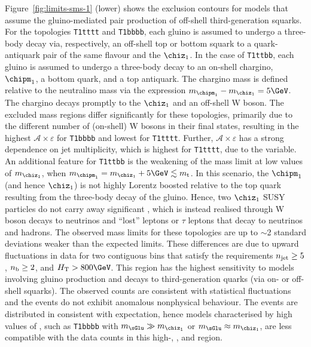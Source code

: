 Figure~\ref{fig:limits-sms-1} (lower) shows the exclusion contours
for models that assume the gluino-mediated pair production of
off-shell third-generation squarks. For the topologies \texttt{T1tttt}
and \texttt{T1bbbb}, each gluino is assumed to undergo a three-body
decay via, respectively, an off-shell top or bottom squark to a
quark-antiquark pair of the same flavour and the $\chiz_1$. In the
case of \texttt{T1ttbb}, each gluino is assumed to undergo a
three-body decay to an on-shell chargino, $\chipm_1$, a bottom quark,
and a top antiquark. The chargino mass is defined relative to the
neutralino mass via the expression $m_{\chipm_1} - m_{\chiz_1} =
5\GeV$. The chargino decays promptly to the $\chiz_1$ and an off-shell
W boson. The excluded mass regions differ significantly for these
topologies, primarily due to the different number of (on-shell) W
bosons in their final states, resulting in the highest $\mathcal{A}
\times \varepsilon$ for \texttt{T1bbbb} and lowest for
\texttt{T1tttt}. Further, $\mathcal{A} \times \varepsilon$ has a
strong dependence on jet multiplicity, which is highest for
\texttt{T1tttt}, due to the \bdphi variable. An additional feature for
\texttt{T1ttbb} is the weakening of the mass limit at low values of
$m_{\chiz_1}$, when $m_{\chipm_1} = m_{\chiz_1} + 5\GeV \lesssim
m_\text{t}$. In this scenario, the $\chipm_1$ (and hence $\chiz_1$) is
not highly Lorentz boosted relative to the top quark resulting from
the three-body decay of the gluino. Hence, two $\chiz_1$ SUSY particles do
not carry away significant \ptvecmiss, which is instead realised
through W boson decays to neutrinos and ``lost'' leptons or $\tau$
leptons that decay to neutrinos and hadrons. The observed mass limits
for these topologies are up to $\sim$2 standard deviations weaker than
the expected limits. These differences are due to upward fluctuations
in data for two contiguous bins that satisfy the requirements $n_{\text{jet}}
\geq 5$, $n_{\text{b}} \geq 2$, and $\scalht > 800\GeV$. This region has the
highest sensitivity to models involving gluino production and decays
to third-generation quarks (via on- or off-shell squarks). The
observed counts are consistent with statistical fluctuations and the
events do not exhibit anomalous nonphysical behaviour. The events are
distributed in \HTmiss consistent with expectation, hence models
characterised by high values of \HTmiss, such as \texttt{T1bbbb} with
$m_{\sGlu} \gg m_{\chiz_1}$ or $m_{\sGlu} \approx m_{\chiz_1}$, are
less compatible with the data counts in this high-\njet, \nb, and
\scalht region.

